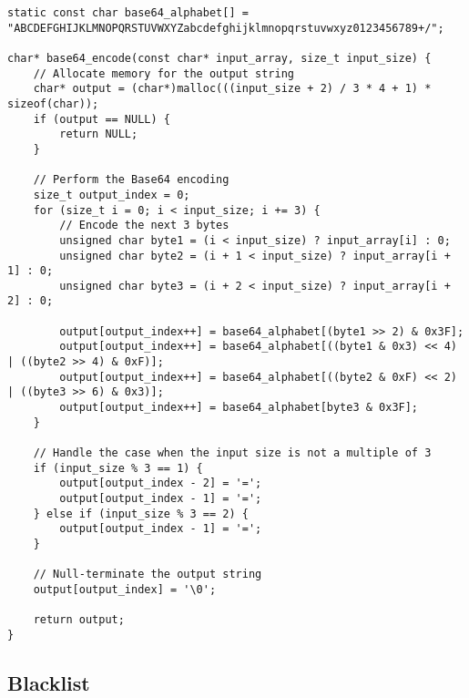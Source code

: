 \begin{lstlisting}
static const char base64_alphabet[] = "ABCDEFGHIJKLMNOPQRSTUVWXYZabcdefghijklmnopqrstuvwxyz0123456789+/";

char* base64_encode(const char* input_array, size_t input_size) {
    // Allocate memory for the output string
    char* output = (char*)malloc(((input_size + 2) / 3 * 4 + 1) * sizeof(char));
    if (output == NULL) {
        return NULL;
    }

    // Perform the Base64 encoding
    size_t output_index = 0;
    for (size_t i = 0; i < input_size; i += 3) {
        // Encode the next 3 bytes
        unsigned char byte1 = (i < input_size) ? input_array[i] : 0;
        unsigned char byte2 = (i + 1 < input_size) ? input_array[i + 1] : 0;
        unsigned char byte3 = (i + 2 < input_size) ? input_array[i + 2] : 0;

        output[output_index++] = base64_alphabet[(byte1 >> 2) & 0x3F];
        output[output_index++] = base64_alphabet[((byte1 & 0x3) << 4) | ((byte2 >> 4) & 0xF)];
        output[output_index++] = base64_alphabet[((byte2 & 0xF) << 2) | ((byte3 >> 6) & 0x3)];
        output[output_index++] = base64_alphabet[byte3 & 0x3F];
    }

    // Handle the case when the input size is not a multiple of 3
    if (input_size % 3 == 1) {
        output[output_index - 2] = '=';
        output[output_index - 1] = '=';
    } else if (input_size % 3 == 2) {
        output[output_index - 1] = '=';
    }

    // Null-terminate the output string
    output[output_index] = '\0';

    return output;
}
\end{lstlisting}

\newpage\subsection{Blacklist}

